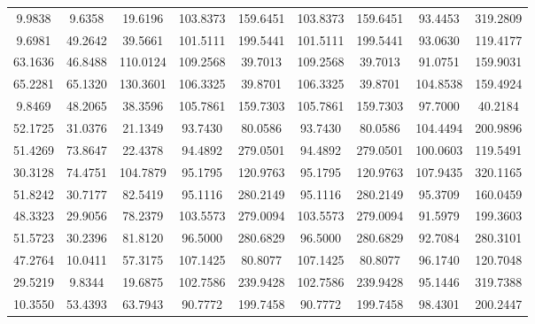 \documentclass[withoutpreface,bwprint]{cumcmthesis}
\begin{document}
\begin{appendices}
\begin{table}[htbp!]
\begin{tabular}{@{}ccccccccc@{}}
				9.9838         & 9.6358         & 19.6196     & 103.8373    & 159.6451    & 103.8373        & 159.6451        & 93.4453         & 319.2809        \\
				9.6981         & 49.2642        & 39.5661     & 101.5111    & 199.5441    & 101.5111        & 199.5441        & 93.0630         & 119.4177        \\
				63.1636        & 46.8488        & 110.0124    & 109.2568    & 39.7013     & 109.2568        & 39.7013         & 91.0751         & 159.9031        \\
				65.2281        & 65.1320        & 130.3601    & 106.3325    & 39.8701     & 106.3325        & 39.8701         & 104.8538        & 159.4924        \\
				9.8469         & 48.2065        & 38.3596     & 105.7861    & 159.7303    & 105.7861        & 159.7303        & 97.7000         & 40.2184         \\
				52.1725        & 31.0376        & 21.1349     & 93.7430     & 80.0586     & 93.7430         & 80.0586         & 104.4494        & 200.9896        \\
				51.4269        & 73.8647        & 22.4378     & 94.4892     & 279.0501    & 94.4892         & 279.0501        & 100.0603        & 119.5491        \\
				30.3128        & 74.4751        & 104.7879    & 95.1795     & 120.9763    & 95.1795         & 120.9763        & 107.9435        & 320.1165        \\
				51.8242        & 30.7177        & 82.5419     & 95.1116     & 280.2149    & 95.1116         & 280.2149        & 95.3709         & 160.0459        \\
				48.3323        & 29.9056        & 78.2379     & 103.5573    & 279.0094    & 103.5573        & 279.0094        & 91.5979         & 199.3603        \\
				51.5723        & 30.2396        & 81.8120     & 96.5000     & 280.6829    & 96.5000         & 280.6829        & 92.7084         & 280.3101        \\
				47.2764        & 10.0411        & 57.3175     & 107.1425    & 80.8077     & 107.1425        & 80.8077         & 96.1740         & 120.7048        \\
				29.5219        & 9.8344         & 19.6875     & 102.7586    & 239.9428    & 102.7586        & 239.9428        & 95.1446         & 319.7388        \\
				10.3550        & 53.4393        & 63.7943     & 90.7772     & 199.7458    & 90.7772         & 199.7458        & 98.4301         & 200.2447        \\

\end{tabular}
\end{table}
\end{appendices}
\end{document}
